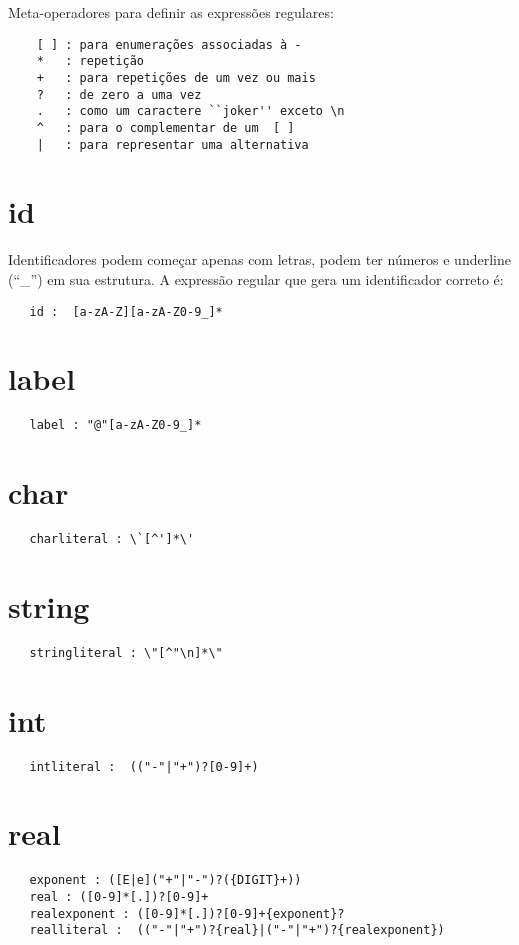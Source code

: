 Meta-operadores para definir as expressões regulares:
\begin{verbatim}
    [ ] : para enumerações associadas à -
    *   : repetição
    +   : para repetições de um vez ou mais
    ?   : de zero a uma vez
    .   : como um caractere ``joker'' exceto \n
    ^   : para o complementar de um  [ ]
    |   : para representar uma alternativa
\end{verbatim}

\section{id}
Identificadores podem começar apenas com letras, podem ter números e underline (``\_'') em sua estrutura.
A expressão regular que gera um identificador correto é:
 \begin{verbatim}
   id :  [a-zA-Z][a-zA-Z0-9_]*
\end{verbatim}

\section{label}
 \begin{verbatim}
   label : "@"[a-zA-Z0-9_]*
\end{verbatim}

\section{char}
\begin{verbatim}
   charliteral : \`[^']*\'
\end{verbatim}

\section{string}
\begin{verbatim}
   stringliteral : \"[^"\n]*\"
\end{verbatim}

\section{int}
\begin{verbatim}
   intliteral :  (("-"|"+")?[0-9]+)
\end{verbatim}

\section{real}
\begin{verbatim}
   exponent : ([E|e]("+"|"-")?({DIGIT}+))
   real : ([0-9]*[.])?[0-9]+
   realexponent : ([0-9]*[.])?[0-9]+{exponent}?
   realliteral :  (("-"|"+")?{real}|("-"|"+")?{realexponent})
\end{verbatim}


